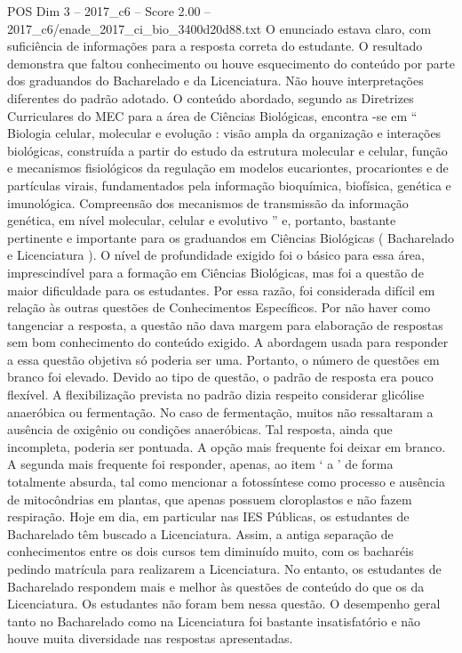 \begin{textsample}{POS Dim 3 – 2017\_c6 – Score 2.00 – 2017\_c6/enade\_2017\_ci\_bio\_3400d20d88.txt}
O enunciado estava claro, com suficiência de informações para a resposta correta do estudante.
O resultado demonstra que faltou conhecimento ou houve esquecimento do conteúdo por parte dos graduandos do Bacharelado e da Licenciatura.
Não houve interpretações diferentes do padrão adotado.
O conteúdo abordado, segundo as Diretrizes Curriculares do MEC para a área de Ciências Biológicas, encontra -se em “ Biologia celular, molecular e evolução : visão ampla da organização e interações biológicas, construída a partir do estudo da estrutura molecular e celular, função e mecanismos fisiológicos da regulação em modelos eucariontes, procariontes e de partículas virais, fundamentados pela informação bioquímica, biofísica, genética e imunológica.
Compreensão dos mecanismos de transmissão da informação genética, em nível molecular, celular e evolutivo ” e, portanto, bastante pertinente e importante para os graduandos em Ciências Biológicas ( Bacharelado e Licenciatura ).
O nível de profundidade exigido foi o básico para essa área, imprescindível para a formação em Ciências Biológicas, mas foi a questão de maior dificuldade para os estudantes.
Por essa razão, foi considerada difícil em relação às outras questões de Conhecimentos Específicos.
Por não haver como tangenciar a resposta, a questão não dava margem para elaboração de respostas sem bom conhecimento do conteúdo exigido.
A abordagem usada para responder a essa questão objetiva só poderia ser uma.
Portanto, o número de questões em branco foi elevado.
Devido ao tipo de questão, o padrão de resposta era pouco flexível.
A flexibilização prevista no padrão dizia respeito considerar glicólise anaeróbica ou fermentação.
No caso de fermentação, muitos não ressaltaram a ausência de oxigênio ou condições anaeróbicas.
Tal resposta, ainda que incompleta, poderia ser pontuada.
A opção mais frequente foi deixar em branco.
A segunda mais frequente foi responder, apenas, ao item ‘ a ’ de forma totalmente absurda, tal como mencionar a fotossíntese como processo e ausência de mitocôndrias em plantas, que apenas possuem cloroplastos e não fazem respiração.
Hoje em dia, em particular nas IES Públicas, os estudantes de Bacharelado têm buscado a Licenciatura.
Assim, a antiga separação de conhecimentos entre os dois cursos tem diminuído muito, com os bacharéis pedindo matrícula para realizarem a Licenciatura.
No entanto, os estudantes de Bacharelado respondem mais e melhor às questões de conteúdo do que os da Licenciatura.
Os estudantes não foram bem nessa questão.
O desempenho geral tanto no Bacharelado como na Licenciatura foi bastante insatisfatório e não houve muita diversidade nas respostas apresentadas.

\end{textsample}
